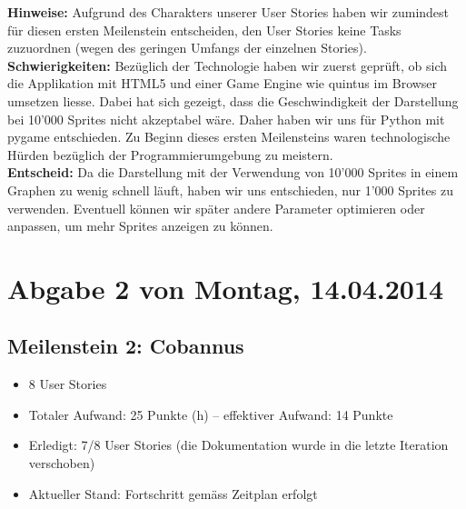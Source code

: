 \begin{small}

\textbf{Hinweise:} Aufgrund des Charakters unserer User Stories haben wir zumindest für diesen ersten Meilenstein entscheiden, den User Stories keine Tasks zuzuordnen (wegen des geringen Umfangs der einzelnen Stories). \\[-0.25cm]

\textbf{Schwierigkeiten:} Bezüglich der Technologie haben wir zuerst geprüft, ob sich die Applikation mit HTML5 und einer Game Engine wie quintus im Browser umsetzen liesse. Dabei hat sich gezeigt, dass die Geschwindigkeit der Darstellung bei 10'000 Sprites nicht akzeptabel wäre. Daher haben wir uns für Python mit pygame entschieden. Zu Beginn dieses ersten Meilensteins waren technologische Hürden bezüglich der Programmierumgebung zu meistern. \\ [-0.25cm]

\textbf{Entscheid:} Da die Darstellung mit der Verwendung von 10'000 Sprites in einem Graphen zu wenig schnell läuft, haben wir uns entschieden, nur 1'000 Sprites zu verwenden. Eventuell können wir später andere Parameter optimieren oder anpassen, um mehr Sprites anzeigen zu können.

\end{small}





\newpage


\vspace*{1cm}


\section*{Abgabe 2 von Montag, 14.04.2014}


\subsection*{Meilenstein 2: Cobannus}

\begin{itemize}[noitemsep]
\item 8 User Stories
\item Totaler Aufwand: 25 Punkte (h) – effektiver Aufwand: 14 Punkte
\item Erledigt: 7/8 User Stories (die Dokumentation wurde in die letzte Iteration verschoben)
\item Aktueller Stand: Fortschritt gemäss Zeitplan erfolgt
\end{itemize}



